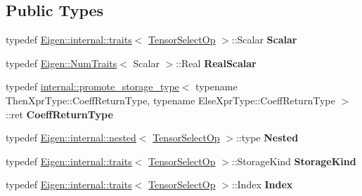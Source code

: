 \subsection*{Public Types}
\begin{DoxyCompactItemize}
\item 
\mbox{\label{class_eigen_1_1_tensor_select_op_a7ee8b8d25ef298c4306f92fd84fdade1}} 
typedef \hyperlink{struct_eigen_1_1internal_1_1traits}{Eigen\+::internal\+::traits}$<$ \hyperlink{class_eigen_1_1_tensor_select_op}{Tensor\+Select\+Op} $>$\+::Scalar {\bfseries Scalar}
\item 
\mbox{\label{class_eigen_1_1_tensor_select_op_a5bfd8aa9d9929830330922fb52778d17}} 
typedef \hyperlink{group___core___module_struct_eigen_1_1_num_traits}{Eigen\+::\+Num\+Traits}$<$ Scalar $>$\+::Real {\bfseries Real\+Scalar}
\item 
\mbox{\label{class_eigen_1_1_tensor_select_op_adf3382ce42bcc784fc87fea06381d40a}} 
typedef \hyperlink{struct_eigen_1_1internal_1_1promote__storage__type}{internal\+::promote\+\_\+storage\+\_\+type}$<$ typename Then\+Xpr\+Type\+::\+Coeff\+Return\+Type, typename Else\+Xpr\+Type\+::\+Coeff\+Return\+Type $>$\+::ret {\bfseries Coeff\+Return\+Type}
\item 
\mbox{\label{class_eigen_1_1_tensor_select_op_a644d1b2a9a11191e5f503a284d6de0ce}} 
typedef \hyperlink{struct_eigen_1_1internal_1_1nested}{Eigen\+::internal\+::nested}$<$ \hyperlink{class_eigen_1_1_tensor_select_op}{Tensor\+Select\+Op} $>$\+::type {\bfseries Nested}
\item 
\mbox{\label{class_eigen_1_1_tensor_select_op_a6d9c4142f12439114687b51a0e7d622d}} 
typedef \hyperlink{struct_eigen_1_1internal_1_1traits}{Eigen\+::internal\+::traits}$<$ \hyperlink{class_eigen_1_1_tensor_select_op}{Tensor\+Select\+Op} $>$\+::Storage\+Kind {\bfseries Storage\+Kind}
\item 
\mbox{\label{class_eigen_1_1_tensor_select_op_a2c538caf796accb9e63a9b8a08909dfb}} 
typedef \hyperlink{struct_eigen_1_1internal_1_1traits}{Eigen\+::internal\+::traits}$<$ \hyperlink{class_eigen_1_1_tensor_select_op}{Tensor\+Select\+Op} $>$\+::Index {\bfseries Index}

\end{DoxyCompactItemize}
